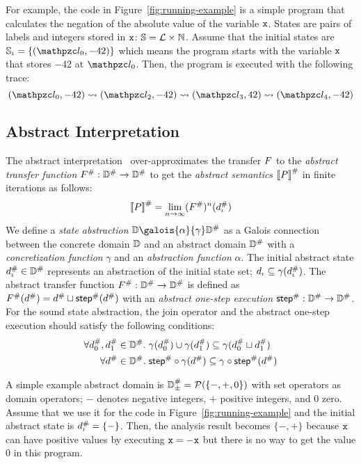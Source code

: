 For example, the code in Figure~\ref{fig:running-example} is a simple program
that calculates the negation of the absolute value of the variable $\texttt{x}$.
States are pairs of labels and integers stored in $\texttt{x}$: $\mathbb{S} = \mathcal{L}
\times \mathbb{N}$.  Assume that the initial states are $\istset = \{ (\lab_0,
-42) \}$ which means the program starts with the variable $\texttt{x}$ that stores
$-42$ at $\lab_0$.  Then, the program is executed with the following trace:
\[
  (\lab_0, -42) \trans (\lab_2, -42) \trans (\lab_3, 42) \trans (\lab_4, -42)
\]


\subsection{Abstract Interpretation}\label{sec:ai}

The abstract interpretation~\cite{abs-interp-1977, abs-interp-1992}
over-approximates the transfer $F$ to the \textit{abstract transfer
function} ${F}^{\#}: {\mathbb{D}}^{\#} \rightarrow {\mathbb{D}}^{\#}$ to get the
\textit{abstract semantics} ${[\![{P}]\!]}^{\#}$ in finite iterations as follows:
\[
    {[\![{P}]\!]}^{\#} = \underset{n \rightarrow
    \infty}{\lim}{({F}^{\#})^n({d}^{\#}_\iota)}\\
\]
We define a \textit{state abstraction} $\dom \galois{\alpha}{\gamma} \absdom$ as
a Galois connection between the concrete domain $\mathbb{D}$ and an abstract domain
${\mathbb{D}}^{\#}$ with a \textit{concretization function} $\gamma$ and an
\textit{abstraction function} $\alpha$.  The initial abstract state ${d}^{\#}_\iota
\in {\mathbb{D}}^{\#}$ represents an abstraction of the initial state set; $d_\iota
\subseteq \gamma({d}^{\#}_\iota)$.  The abstract transfer function ${F}^{\#}:
{\mathbb{D}}^{\#} \rightarrow {\mathbb{D}}^{\#}$ is defined as ${F}^{\#}({d}^{\#}) = {d}^{\#}
\sqcup {\textsf{step}}^{\#}({d}^{\#})$ with an \textit{abstract one-step execution}
${\textsf{step}}^{\#}: {\mathbb{D}}^{\#} \rightarrow {\mathbb{D}}^{\#}$.  For the sound state abstraction, the
join operator and the abstract one-step execution should satisfy the following
conditions:
\begin{align}
  \forall {d}^{\#}_0, {d}^{\#}_1 \in {\mathbb{D}}^{\#} & . \; \gamma({d}^{\#}_0) \cup
  \gamma({d}^{\#}_1) \subseteq \gamma({d}^{\#}_0 \sqcup
  {d}^{\#}_1) \label{equ:sound-join}\\
  \forall {d}^{\#} \in {\mathbb{D}}^{\#} & . \; {\textsf{step}}^{\#} \circ \gamma({d}^{\#}) \subseteq
  \gamma \circ {\textsf{step}}^{\#}({d}^{\#}) \label{equ:sound-step}
\end{align}

A simple example abstract domain is ${\mathbb{D}}^{\#}_\pm = \mathcal{P}(\{ -, +, 0 \})$ with
set operators as domain operators; $-$ denotes negative integers, $+$ positive
integers, and $0$ zero.  Assume that we use it for the code in
Figure~\ref{fig:running-example} and the initial abstract state is ${d}^{\#}_\iota =
\{ - \}$. Then, the analysis result becomes $\{ -, + \}$ because $\texttt{x}$ can
have positive values by executing $\texttt{x} = -\texttt{x}$ but there is no way to get
the value $0$ in this program.


